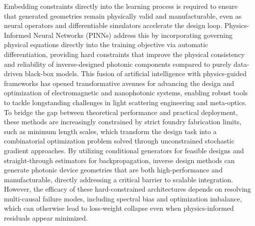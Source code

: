 \documentclass[11pt]{article}
\begin{document}
Embedding constraints directly into the learning process is required to ensure that generated geometries remain physically valid and manufacturable, even as neural operators and differentiable simulators accelerate the design loop. Physics-Informed Neural Networks (PINNs) address this by incorporating governing physical equations directly into the training objective via automatic differentiation, providing hard constraints that improve the physical consistency and reliability of inverse-designed photonic components compared to purely data-driven black-box models. \citep{doi_10_48550_arxiv_2606_12337_68b62bfa} \citep{doi_10_48550_arxiv_2603_09359_098af542} This fusion of artificial intelligence with physics-guided frameworks has opened transformative avenues for advancing the design and optimization of electromagnetic and nanophotonic systems, enabling robust tools to tackle longstanding challenges in light scattering engineering and meta-optics. To bridge the gap between theoretical performance and practical deployment, these methods are increasingly constrained by strict foundry fabrication limits, such as minimum length scales, which transform the design task into a combinatorial optimization problem solved through unconstrained stochastic gradient approaches. By utilizing conditional generators for feasible designs and straight-through estimators for backpropagation, inverse design methods can generate photonic device geometries that are both high-performance and manufacturable, directly addressing a critical barrier to scalable integration. However, the efficacy of these hard-constrained architectures depends on resolving multi-causal failure modes, including spectral bias and optimization imbalance, which can otherwise lead to loss-weight collapse even when physics-informed residuals appear minimized. \citep{s2_cc39d5405a933620426d86298fa8fe4cd51915c5_27626ee3} \citep{s2_037e66f37189104d61c0d000de0cee202b7eec9e_d15b8018} \citep{doi_10_1021_acsphotonics_2c00313_0d7d39c3}
\end{document}
